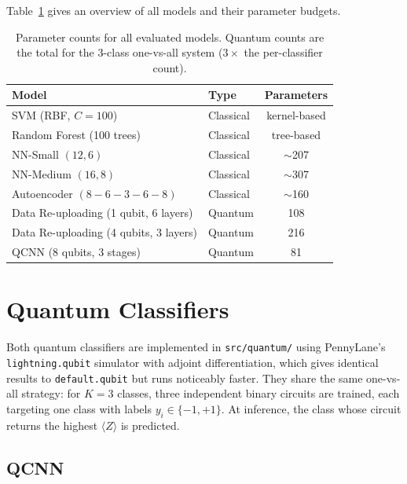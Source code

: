 Table~\ref{tab:model_params} gives an overview of all models and their parameter budgets.

\begin{table}[ht]
\centering
\begin{tabular}{llc}
    \toprule
    \textbf{Model} & \textbf{Type} & \textbf{Parameters} \\
    \midrule
    SVM (RBF, $C{=}100$)          & Classical & kernel-based \\
    Random Forest (100 trees)      & Classical & tree-based   \\
    NN-Small $(12,6)$              & Classical & $\sim$207    \\
    NN-Medium $(16,8)$             & Classical & $\sim$307    \\
    Autoencoder $(8\!-\!6\!-\!3\!-\!6\!-\!8)$ & Classical & $\sim$160    \\
    \midrule
    Data Re-uploading (1 qubit, 6 layers)  & Quantum & 108 \\
    Data Re-uploading (4 qubits, 3 layers) & Quantum & 216 \\
    QCNN (8 qubits, 3 stages)             & Quantum & 81  \\
    \bottomrule
\end{tabular}
\caption{Parameter counts for all evaluated models. Quantum counts are the total for the 3-class one-vs-all system ($3\times$ the per-classifier count).}
\label{tab:model_params}
\end{table}

\section{Quantum Classifiers}
\label{sec:impl_quantum}

Both quantum classifiers are implemented in \texttt{src/quantum/} using PennyLane's \texttt{lightning.qubit} simulator with adjoint differentiation, which gives identical results to \texttt{default.qubit} but runs noticeably faster. They share the same one-vs-all strategy: for $K = 3$ classes, three independent binary circuits are trained, each targeting one class with labels $y_i \in \{-1, +1\}$. At inference, the class whose circuit returns the highest $\langle Z \rangle$ is predicted.

\subsection{QCNN}

